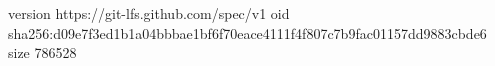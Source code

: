 version https://git-lfs.github.com/spec/v1
oid sha256:d09e7f3ed1b1a04bbbae1bf6f70eace4111f4f807c7b9fac01157dd9883cbde6
size 786528
